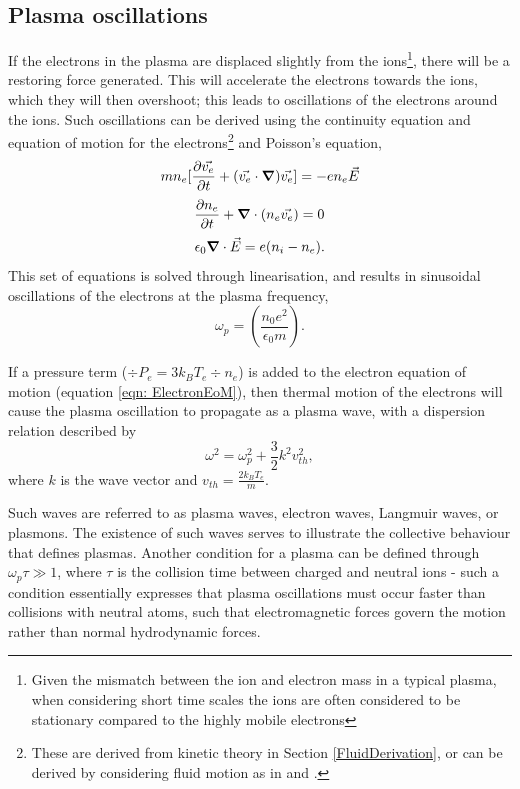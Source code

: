 \subsection{Plasma oscillations} \label{PlasmaOscillations}
If the electrons in the plasma are displaced slightly from the ions\footnote{Given the mismatch between the ion and electron mass in a typical plasma, when considering short time scales the ions are often considered to be stationary compared to the highly mobile electrons}, there will be a restoring force generated. This will accelerate the electrons towards the ions, which they will then overshoot; this leads to oscillations of the electrons around the ions. Such oscillations can be derived using the continuity equation and equation of motion for the electrons\footnote{These are derived from kinetic theory in Section \ref{FluidDerivation}, or can be derived by considering fluid motion as in \cite{Chen2015} and \cite{Piel2017}.} and Poisson's equation,
\begin{equation} m n_e [\frac{\partial\vec{v_e}}{\partial t} + (\vec{v_e} \cdot \grad)\vec{v_e}] = -e n_e \vec{E} \end{equation}
\begin{equation} \frac{\partial n_e}{\partial t} + \grad \cdot (n_e \vec{v_e}) = 0 \label{eqn: ElectronEoM} \end{equation}
\begin{equation} \epsilon_0 \grad \cdot \vec{E} = e(n_i - n_e). \end{equation}
This set of equations is solved through linearisation, and results in sinusoidal oscillations of the electrons at the plasma frequency, 
\begin{equation} \omega_p = \left( \frac{n_0 e^2}{\epsilon_0 m}\right). \label{eqn: PlasmaFrequency} \end{equation}

If a pressure term ($\div P_e = 3 k_B T_e \div n_e$) is added to the electron equation of motion (equation \ref{eqn: ElectronEoM}), then thermal motion of the electrons will cause the plasma oscillation to propagate as a plasma wave, with a dispersion relation described by
\begin{equation} \omega^2 = \omega_p^2 + \frac{3}{2} k^2 v_{th}^2, \end{equation}
where $k$ is the wave vector and $v_{th} = \frac{2 k_B T_e}{m}$. 

Such waves are referred to as plasma waves, electron waves, Langmuir waves, or plasmons. The existence of such waves serves to illustrate the collective behaviour that defines plasmas. Another condition for a plasma can be defined through $\omega_p \tau \gg 1$, where $\tau$ is the collision time between charged and neutral ions - such a condition essentially expresses that plasma oscillations must occur faster than collisions with neutral atoms, such that electromagnetic forces govern the motion rather than normal hydrodynamic forces.

